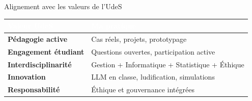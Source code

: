 \documentclass[aspectratio=169,11pt]{beamer}
\begin{document}
\begin{frame}{Alignement avec les valeurs de l'UdeS}
  \begin{center}
    \renewcommand{\arraystretch}{1.4}
    \begin{tabular}{>{\raggedright}p{4.5cm}|>{\raggedright\arraybackslash}p{7cm}}
      \rowcolor{ushervert}
      \textcolor{white}{\textbf{Valeur UdeS}} & \textcolor{white}{\textbf{Ma pratique}} \\
      \hline
      \rowcolor{ushervertclair}
      \textbf{Pédagogie active} & Cas réels, projets, prototypage \\
      \hline
      \textbf{Engagement étudiant} & Questions ouvertes, participation active \\
      \hline
      \rowcolor{ushervertclair}
      \textbf{Interdisciplinarité} & Gestion + Informatique + Statistique + Éthique \\
      \hline
      \textbf{Innovation} & LLM en classe, ludification, simulations \\
      \hline
      \rowcolor{ushervertclair}
      \textbf{Responsabilité} & Éthique et gouvernance intégrées \\
    \end{tabular}
  \end{center}
  
  \vspace{0.5em}
  
  \begin{center}
  \end{center}
\end{frame}
\end{document}
